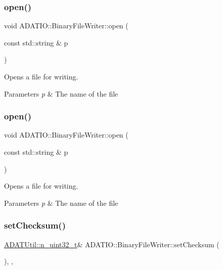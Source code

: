 \subsubsection{\texorpdfstring{open()}{open()}\hspace{0.1cm}{\footnotesize\ttfamily [2/3]}}
{\footnotesize\ttfamily void A\+D\+A\+T\+I\+O\+::\+Binary\+File\+Writer\+::open (\begin{DoxyParamCaption}\item[{const std\+::string \&}]{p }\end{DoxyParamCaption})}

Opens a file for writing. 
\begin{DoxyParams}{Parameters}
{\em p} & The name of the file \\
\hline
\end{DoxyParams}
\mbox{\label{classADATIO_1_1BinaryFileWriter_a943ba19816b403b36f50f72740ea856a}} 
\subsubsection{\texorpdfstring{open()}{open()}\hspace{0.1cm}{\footnotesize\ttfamily [3/3]}}
{\footnotesize\ttfamily void A\+D\+A\+T\+I\+O\+::\+Binary\+File\+Writer\+::open (\begin{DoxyParamCaption}\item[{const std\+::string \&}]{p }\end{DoxyParamCaption})}

Opens a file for writing. 
\begin{DoxyParams}{Parameters}
{\em p} & The name of the file \\
\hline
\end{DoxyParams}
\mbox{\label{classADATIO_1_1BinaryFileWriter_a0137ec5926d08e49ed7a63c6ef33e882}} 
\subsubsection{\texorpdfstring{setChecksum()}{setChecksum()}\hspace{0.1cm}{\footnotesize\ttfamily [1/3]}}
{\footnotesize\ttfamily \mbox{\hyperlink{namespaceADATUtil_ad945a8afa4db2d1f89b731964adae97e}{A\+D\+A\+T\+Util\+::n\+\_\+uint32\+\_\+t}}\& A\+D\+A\+T\+I\+O\+::\+Binary\+File\+Writer\+::set\+Checksum (\begin{DoxyParamCaption}{ }\end{DoxyParamCaption})\hspace{0.3cm}{\ttfamily [inline]}, {\ttfamily [protected]}, {\ttfamily [virtual]}}



